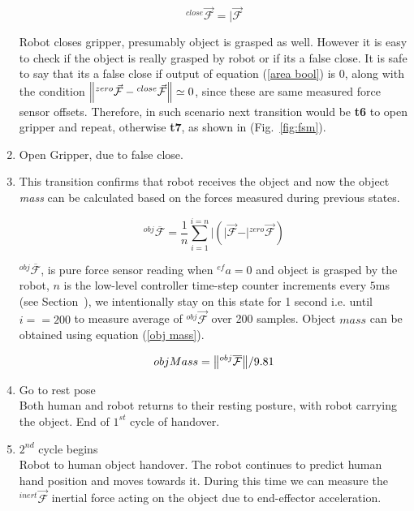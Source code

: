 \begin{enumerate}[start=0,label={\bf{t}\arabic*:}]
        \begin{equation}\label{Fclose}
        {}^{close}\vec{\mathcal{F}} = \vert{\vec{\mathcal{F}}}
        \end{equation}
    
    Robot closes gripper, presumably object is grasped as well. However it is easy to check if the object is really grasped by robot or if its a false close. It is safe to say that its a false close if output of equation (\ref{area bool}) is $0$, along with the condition $\norm{{}^{zero}\vec{\mathcal{F}}-{}^{close}\vec{\mathcal{F}}} \simeq{0}$, since these are same measured force sensor offsets. Therefore, in such scenario next transition would be \textbf{t6} to open gripper and repeat, otherwise \textbf{t7}, as shown in (Fig.~\ref{fig:fsm}).
    
    \item Open Gripper, due to false close.
    
    \item This transition confirms that robot receives the object and now the object \textit{mass} can be calculated based on the forces measured during previous states.
    
    \begin{equation}
        {}^{obj}\overline{\mathcal{F}} = \frac{1}{n}\sum_{i=1}^{i=n} \vert{ (\vert{\vec{\mathcal{F}}} - \vert{{}^{zero}\vec{\mathcal{F}}}) }
    \end{equation}
    
    ${}^{obj}\overline{\mathcal{F}}$, is pure force sensor reading when ${}^{ef}a=0$ and object is grasped by the robot, $n$ is the low-level controller time-step counter increments every $5$ms (see Section~), we intentionally stay on this state for 1 second i.e. until $i==200$ to measure average of ${}^{obj}\vec{\mathcal{F}}$ over 200 samples. Object $mass$ can be obtained using equation (\ref{obj mass}).
    
    \begin{equation}\label{obj mass}
        objMass = \norm{{}^{obj}\overline{\mathcal{F}}}/9.81
    \end{equation}

    \item Go to rest pose \\
    Both human and robot returns to their resting posture, with robot carrying the object. End of $1^{st}$ cycle of handover.
    
    \item $2^{nd}$ cycle begins\\
    Robot to human object handover. The robot continues to predict human hand position and moves towards it. During this time we can measure the ${}^{inert}\vec{\mathcal{F}}$ inertial force acting on the object due to end-effector acceleration.


\end{enumerate}
